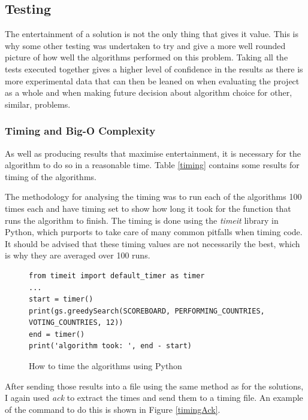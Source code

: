 \documentclass[12pt]{report}
\begin{document}

\subsection{Testing}\label{OtherTesting}
The entertainment of a solution is not the only thing that gives it value. This is why some other testing was undertaken to try and give a more well rounded picture of how well the algorithms performed on this problem. Taking all the tests executed together gives a higher level of confidence in the results as there is more experimental data that can then be leaned on when evaluating the project as a whole and when making future decision about algorithm choice for other, similar, problems.

\subsubsection{Timing and Big-O Complexity}
As well as producing results that maximise entertainment, it is necessary for the algorithm to do so in a reasonable time. Table \ref{timing} contains some results for timing of the algorithms.

The methodology for analysing the timing was to run each of the algorithms 100 times each and have timing set to show how long it took for the function that runs the algorithm to finish. The timing is done using the \textit{timeit}\cite{PythonTimeit} library in Python, which purports to take care of many common pitfalls when timing code. It should be advised that these timing values are not necessarily the best, which is why they are averaged over 100 runs.

\begin{figure}[H]
\caption{How to time the algorithms using Python}
\label{timingCode}
\begin{verbatim}
from timeit import default_timer as timer
...
start = timer()
print(gs.greedySearch(SCOREBOARD, PERFORMING_COUNTRIES, VOTING_COUNTRIES, 12))
end = timer()
print('algorithm took: ', end - start)
\end{verbatim}
\end{figure}

After sending those results into a file using the same method as for the solutions, I again used \textit{ack} to extract the times and send them to a timing file. An example of the command to do this is shown in Figure \ref{timingAck}.
\end{document}
